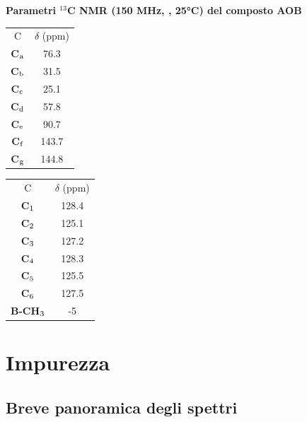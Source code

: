 \documentclass[a4paper, italian, oneside, 12pt]{article}
\begin{document}
{%
\begin{table}[hb]\begin{center}
 {\bf{Parametri $^{13}$C NMR (150 MHz, , 25°C) del composto AOB}}\end{center}

\begin{multicols}{2}
\begin{center}
\begin{tabular}{c|c}
\toprule
C & $\delta $ (ppm)\\\cmidrule(r){1-1}\cmidrule(l){2-2}
{\bf{C$_{\textrm a}$}} &
 76.3\\{\bf{C$_{\textrm b}$}} &
 31.5\\{\bf{C$_{\textrm c}$}} &
 25.1\\{\bf{C$_{\textrm d}$}} &
 57.8\\{\bf{C$_{\textrm e}$}} &
 90.7\\{\bf{C$_{\textrm f}$}} &
 143.7\\{\bf{C$_{\textrm g}$}} &
 144.8\\\bottomrule
\end{tabular}
\end{center}
\columnbreak
\begin{center}
\begin{tabular}{c|c}
\toprule
C & $\delta $ (ppm)\\\cmidrule(r){1-1}\cmidrule(l){2-2}
{\bf{C$_{\textrm 1}$}} &
 128.4\\{\bf{C$_{\textrm 2}$}} &
 125.1\\{\bf{C$_{\textrm 3}$}} &
 127.2\\{\bf{C$_{\textrm 4}$}} &
 128.3\\{\bf{C$_{\textrm 5}$}} &
 125.5\\{\bf{C$_{\textrm 6}$}} &
 127.5\\{\bf{B-CH$_{\textrm 3}$}} &
 -5\\\bottomrule
\end{tabular}
\end{center}
\end{multicols}
\end{table}}



\clearpage

\section{Impurezza}
\subsection{Breve panoramica degli spettri}
\end{document}
